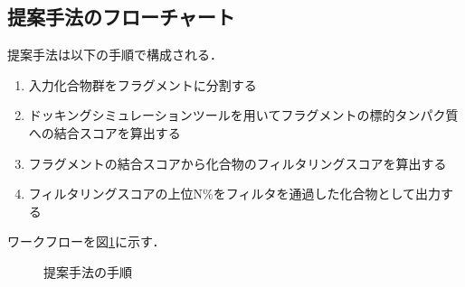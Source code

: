 \subsection{提案手法のフローチャート}\label{subsec:flowchart}
提案手法は以下の手順で構成される．
\begin{enumerate}
\item 入力化合物群をフラグメントに分割する
\item ドッキングシミュレーションツールを用いてフラグメントの標的タンパク質への結合スコアを算出する
\item フラグメントの結合スコアから化合物のフィルタリングスコアを算出する
\item フィルタリングスコアの上位N\%をフィルタを通過した化合物として出力する
\end{enumerate}
ワークフローを図\ref{fig:workflow}に示す．

\begin{figure}[p]
 \begin{center}
  \caption{提案手法の手順}
  \label{fig:workflow}
 \end{center}
\end{figure}

